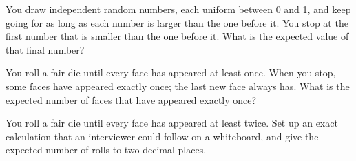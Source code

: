 \begin{question}\label{iq:iv1:expectation-and-indicators:23}
You draw independent random numbers, each uniform between 0 and 1, and keep going for as long as each number is
larger than the one before it. You stop at the first number that is smaller than the one before it. What is the
expected value of that final number?
\end{question}

\begin{question}\label{iq:iv1:expectation-and-indicators:24}
You roll a fair die until every face has appeared at least once. When you stop, some faces have appeared exactly
once; the last new face always has. What is the expected number of faces that have appeared exactly once?
\end{question}

\begin{question}\label{iq:iv1:expectation-and-indicators:25}
You roll a fair die until every face has appeared at least twice. Set up an exact calculation that an interviewer
could follow on a whiteboard, and give the expected number of rolls to two decimal places.
\end{question}
